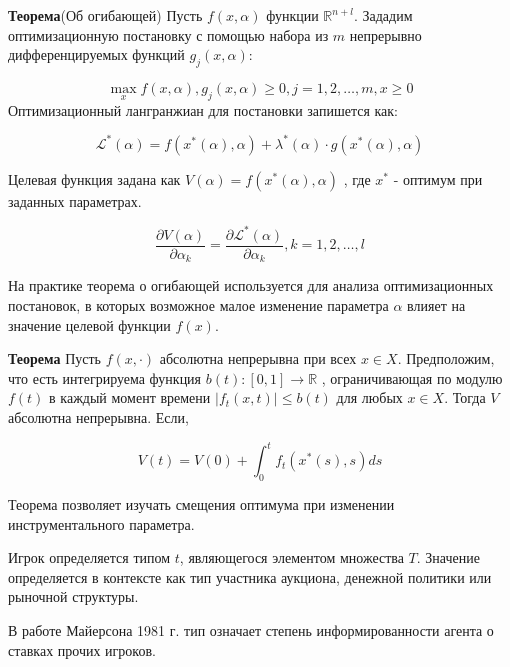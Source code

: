 
\textbf{Теорема}(Об огибающей) Пусть $f(x,\alpha)$  функции $\mathbb{R}^{n+l}$. Зададим оптимизационную постановку с помощью набора из $m$ непрерывно дифференцируемых функций $g_j(x,\alpha)$:

$$
    \max_{x} f(x,\alpha), g_j(x,\alpha) \ge 0, j=1,2,\dots,m, x\ge 0
$$
Оптимизационный лангранжиан для постановки запишется как:

$$
    \mathcal{L}^*(\alpha)=f(x^*(\alpha),\alpha) +\lambda^*(\alpha) \cdot g(x^*(\alpha),\alpha)
$$

Целевая функция задана как $V(\alpha)=f(x^*(\alpha),\alpha)$ , где $x^*$ - оптимум при заданных параметрах.

$$
    \frac{\partial V(\alpha)}{\partial \alpha_k} = \frac{\partial \mathcal{L}^*(\alpha)}{\partial \alpha_k}, k=1,2,\dots,l
$$

На практике теорема о огибающей используется для анализа оптимизационных постановок, в которых возможное малое изменение параметра $\alpha$ влияет на значение целевой функции $f(x)$.

\textbf{Теорема} Пусть $f(x,\cdot)$ абсолютна непрерывна при всех $x \in X$. Предположим, что есть интегрируема функция $b(t):[0,1] \rightarrow \mathbb{R}$ , ограничивающая по модулю $f(t)$ в каждый момент времени $|f_t(x,t)| \le b(t)$ для любых $x\in X$. Тогда $V$ абсолютна непрерывна. Если, 

$$
    V(t) = V(0) + \int_0^t f_t(x^*(s),s) ds
$$

Теорема позволяет изучать смещения оптимума при изменении инструментального параметра.


Игрок определяется типом {$t$}, являющегося элементом множества $T$. Значение определяется в контексте как тип участника аукциона, денежной политики или рыночной структуры.

В работе Майерсона 1981 г. \cite{myerson1983mechanism} тип означает степень информированности агента о ставках прочих игроков.




